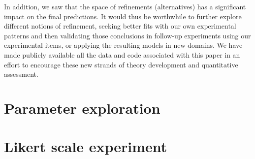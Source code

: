 \documentclass[leqno,12pt]{article}
\begin{document}
In addition, we saw that the space of refinements (alternatives) has a
significant impact on the final predictions. It would thus be
worthwhile to further explore different notions of refinement, seeking
better fits with our own experimental patterns and then validating
those conclusions in follow-up experiments using our experimental
items, or applying the resulting models in new domains.  We have made
publicly available all the data and code associated with this paper in
an effort to encourage these new strands of theory development and
quantitative assessment.

\begin{appendix}
  \section{Parameter exploration}\label{app:paramexplore}

  \section{Likert scale experiment}\label{app:likert}

\end{appendix}




\setlength{\bibsep}{0pt}

\end{document}
